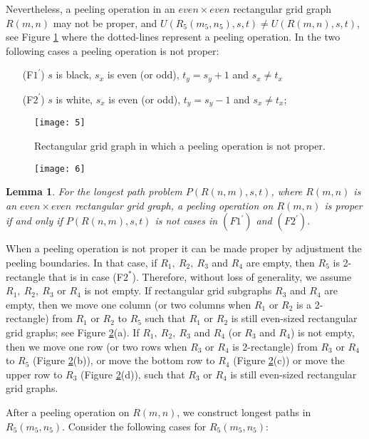 \documentclass[preprint,12pt]{elsarticle}
\newtheorem{lem}{Lemma}[section]
\begin{document}
Nevertheless, a peeling operation in an $even\times even$
rectangular grid graph $R(m,n)$ may not be proper, and
$U(R_{5}(m_{5},n_{5}),s,t)\neq U(R(m,n),s,t)$, see Figure \ref{bs}
where the dotted-lines represent a peeling operation. In the two
following cases a peeling operation is not proper:
\begin{enumerate}
\item [(F$1^{'}$)] $s$ is black, $s_x$ is even (or
odd), $t_y=s_y+1$ and $s_x\neq t_x$
\item [(F$2^{'}$)]$s$ is white, $s_x$ is even (or odd), $t_y=s_y-1$ and
$s_x\neq t_x$;
\end{enumerate}
\begin{figure}[tb]
  \centering
  \texttt{[image: 5]}
  \caption[]{\small Rectangular grid graph in which a peeling operation is not proper.}
  \label{bs}
\end{figure}
\begin{figure}[tb]
  \centering
  \texttt{[image: 6]}
  \caption[]{\small }
  \label{bj}
\end{figure}
\begin{lem} \label{Lemma:7} For the longest path problem $P(R(n,m),s,t)$, where
$R(m,n)$ is an $even \times even$ rectangular grid graph, a peeling
operation on $R(m,n)$ is proper if and only if $P(R(n,m),s,t)$ is
not cases in $(F1^{'})$ and $(F2^{'})$.
\end{lem}
When a peeling operation is not proper it can be made proper by
adjustment the peeling boundaries. In that case, if $R_{1},\ R_{2},
\ R_{3}$ and $R_{4} $ are empty, then $ R_{5}$ is 2-rectangle that
is in case (F$2^*$). Therefore, without loss of generality, we
assume $R_{1},\ R_{2}, \ R_{3}$ or $R_{4} $ is not empty. If
rectangular grid subgraphs $R_{3}$ and $R_{4}$ are empty, then we
move one column (or two columns when $R_{1}$ or $R_{2}$ is a
2-rectangle) from $R_{1}$ or $R_{2}$ to $R_{5}$ such that $R_{1}$ or
$R_{2}$ is still even-sized rectangular grid graphs; see Figure
\ref{bj}(a). If $R_{1},\ R_{2}, \ R_{3}$ and $R_{4}$ (or $R_{3}$ and
$R_{4}$) is not empty, then we move one row (or two rows when
$R_{3}$ or $R_{4}$ is 2-rectangle) from $R_{3}$ or $R_{4}$ to
$R_{5}$ (Figure \ref{bj}(b)), or move the bottom row to $R_{4}$
(Figure \ref{bj}(c)) or move the upper row to $R_{3}$ (Figure
\ref{bj}(d)), such that $R_{3}$ or $R_{4}$ is still even-sized
rectangular grid graphs.
\par After a peeling operation on $R(m,n)$, we construct longest paths
in $R_5(m_5,n_5)$. Consider the following cases for $R_5(m_5,n_5)$:
\end{document}
